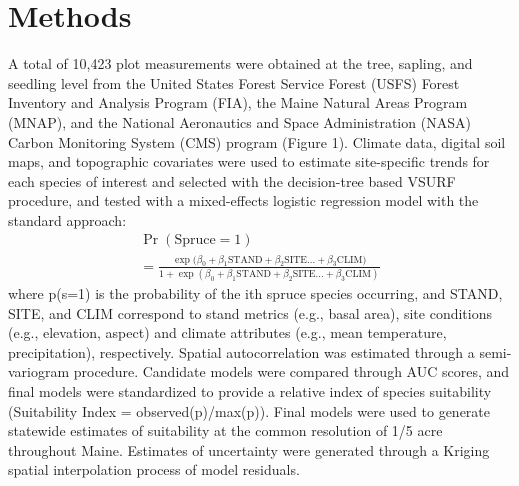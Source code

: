 \documentclass[9pt, twocolumn]{article}
\begin{document}
\section{Methods}
A total of 10,423 plot measurements were obtained at the tree, sapling, and seedling level from the United States Forest Service Forest (USFS) Forest Inventory and Analysis Program (FIA), the Maine Natural Areas Program (MNAP), and the National Aeronautics and Space Administration (NASA) Carbon Monitoring System (CMS) program (Figure 1). Climate data, digital soil maps, and topographic covariates were used to estimate site-specific trends for each species of interest and selected with the decision-tree based VSURF procedure, and tested with a mixed-effects logistic regression model with the standard approach: 
\begin{multline}
	\operatorname{Pr}(\text{Spruce} = 1)\\
	= \frac{\exp(\beta_{0} + \beta_{1} \text{STAND} + \beta_{2} \text{SITE} \dots +\beta_{3} \text{CLIM)} }{1 + \exp(\beta_{0} + \beta_{1} \text{STAND} + \beta_{2} \text{SITE} \dots +\beta_{3 }\text{CLIM})}
\end{multline}
\setlength\parindent{0pt}
where p(s=1) is the probability of the ith spruce species occurring, and STAND, SITE, and CLIM correspond to stand metrics (e.g., basal area), site conditions (e.g., elevation, aspect) and climate attributes (e.g., mean temperature, precipitation), respectively. Spatial autocorrelation was estimated through a semi-variogram procedure. Candidate models were compared through AUC scores, and final models were standardized to provide a relative index of species suitability (Suitability Index = observed(p)/max(p)). 
Final models were used to generate statewide estimates of suitability at the common resolution of 1/5 acre throughout Maine. Estimates of uncertainty were generated through a Kriging spatial interpolation process of model residuals. 
\end{document}
